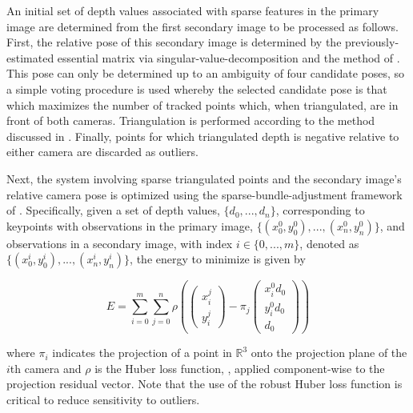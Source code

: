 \documentclass[conference]{acmsiggraph}
\begin{document}
An initial set of depth values associated with sparse features in
the primary image are determined from the first secondary image
to be processed as follows.  First, the relative pose of this secondary
image is determined by the previously-estimated essential matrix via
singular-value-decomposition and the method of \cite{hartley2003multiple}.
This pose can only be determined up to an ambiguity of four candidate poses,
so a simple voting procedure is used whereby the selected candidate pose is
that which maximizes the number of tracked points which, when triangulated,
are in front of both cameras.  Triangulation is performed according to the
method discussed in \cite{hartley1997triangulation}.  Finally, points
for which triangulated depth is negative relative to either camera
are discarded as outliers.

Next, the system involving sparse triangulated points and the secondary
image's relative camera pose is optimized using the sparse-bundle-adjustment
framework of \cite{ceres-solver}.  Specifically, given a set of depth values,
$\{d_0, ..., d_n\}$, corresponding to keypoints with observations in the
primary image, $\{(x_0^0, y_0^0), ..., (x_n^0, y_n^0)\}$, and observations
in a secondary image, with index $i \in \{0, ..., m\}$, denoted as
$\{(x_0^i, y_0^i), ..., (x_n^i, y_n^i)\}$, the energy to minimize is
given by

\begin{equation}
    \label{eq:sfm}
    E = \sum_{i=0}^{m} \sum_{j=0}^{n}
    \rho \left(
    \begin{pmatrix}
        x_i^j\\
        y_i^j
    \end{pmatrix}
    -
    \pi_j
    \begin{pmatrix}
        x_i^0 d_0\\
        y_i^0 d_0\\
        d_0
    \end{pmatrix}
    \right)
\end{equation}

where $\pi_i$ indicates the projection of a point in $\mathbb{R}^3$ onto
the projection plane of the $i$th camera and
$\rho$ is the Huber loss function, \cite{huber1964robust}, applied component-wise
to the projection residual vector.  Note that the use of the robust Huber loss
function is critical to reduce sensitivity to outliers.
\end{document}
